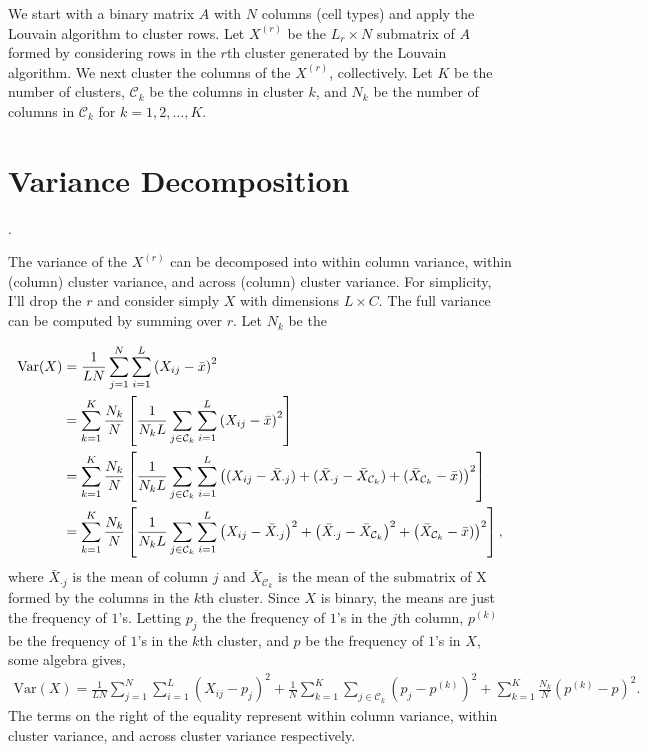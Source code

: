 \documentclass{article}
\newcommand{\CC}{\mathcal{C}}
\begin{document}
	We start with a binary matrix $A$ with $N$ columns (cell types) and apply the Louvain algorithm to cluster rows.  Let $X^{(r)}$ be the $L_r \times N$ submatrix of $A$ formed by considering rows in the $r$th cluster generated by the Louvain algorithm.  We next cluster the columns of the  $X^{(r)}$, collectively.  Let $K$ be the number of clusters, $\CC_k$ be the columns in cluster $k$, and $N_k$ be the number of columns in $\CC_k$ for $k=1,2,\dots,K$.  
	
\section{Variance Decomposition}.

	The variance of the $X^{(r)}$ can be decomposed into within column variance, within (column) cluster variance, and across (column) cluster variance.   For simplicity, I'll drop the $r$ and consider simply $X$ with dimensions $L \times C$.  The full variance can be computed by summing over $r$.  Let $N_k$ be the 
	
\begin{align}
\text{Var}(X) &= \frac{1}{LN} \sum_{j=1}^N \sum_{i=1}^L \left(X_{ij} - \bar{x} \right)^2
\\ \notag
	& = \sum_{k=1}^K \frac{N_k}{N} \left[\frac{1}{N_k L} \sum_{j \in \CC_k} \sum_{i=1}^L \left(X_{ij} - \bar{x} \right)^2 \right]
\\ \notag
	& = \sum_{k=1}^K \frac{N_k}{N} \left[\frac{1}{N_k L} \sum_{j \in \CC_k} \sum_{i=1}^L 
	\left((X_{ij} - \bar{X}_{\cdot j}) + (\bar{X}_{\cdot j} - \bar{X}_{\CC_k}) + (\bar{X}_{\CC_k} - \bar{x}) \right)^2 \right]
\\ \notag 
& = \sum_{k=1}^K \frac{N_k}{N} \left[\frac{1}{N_k L} \sum_{j \in \CC_k} \sum_{i=1}^L 
	\left(X_{ij} - \bar{X}_{\cdot j}\right)^2 + \left( \bar{X}_{\cdot j} - \bar{X}_{\CC_k} \right)^2 + \left(\bar{X}_{\CC_k} - \bar{x}) \right)^2 \right],
\end{align}
where $\bar{X}_{\cdot j}$ is the mean of column $j$ and $\bar{X}_{\CC_k}$ is the mean of the submatrix of X formed by the columns in the $k$th cluster.  Since $X$ is binary, the means are just the frequency of $1$'s.  Letting $p_j$ the the frequency of $1$'s in the $j$th column, $p^{(k)}$ be the frequency of $1$'s in the $k$th cluster, and $p$ be the frequency of $1$'s in $X$,  some algebra gives,
\begin{align}
\text{Var}(X) = \frac{1}{LN} \sum_{j=1}^N \sum_{i=1}^L \left(X_{ij} -p_j \right)^2
+ \frac{1}{N} \sum_{k=1}^K \sum_{j \in \CC_k} \left( p_j - p^{(k)} \right)^2 
+ \sum_{k=1}^K \frac{N_k}{N} \left( p^{(k)} - p \right)^2.
\end{align}
The terms on the right of the equality represent within column variance, within cluster variance, and across cluster variance respectively.
\end{document}

